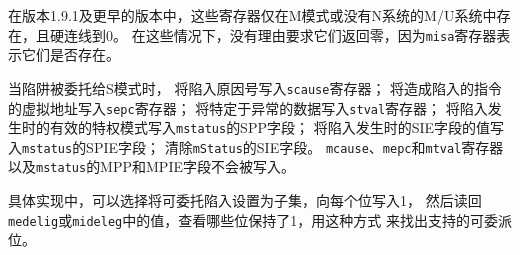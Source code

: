 \iffalse
\begin{commentary}
  In versions 1.9.1 and earlier , these registers existed but were
  hardwired to zero in M-mode only, or M/U without N systems.  There
  is no reason to require they return zero in those cases, as the {\tt
    misa} register indicates whether they exist.
\end{commentary}
\fi

\begin{commentary}
 在版本1.9.1及更早的版本中，这些寄存器仅在M模式或没有N系统的M/U系统中存在，且硬连线到0。
 在这些情况下，没有理由要求它们返回零，因为{\tt misa}寄存器表示它们是否存在。
\end{commentary}

\iffalse
When a trap is delegated to S-mode, the
{\tt scause} register is written with the trap cause; the
{\tt sepc} register is written with the virtual address of
the instruction that took the trap; the
{\tt stval} register is written with an
exception-specific datum; the SPP field
of {\tt mstatus} is written with the active privilege mode at the time of
the trap; the SPIE field of {\tt mstatus} is written with the
value of the SIE field at the time of the trap; and
the SIE field of {\tt mstatus} is cleared.
The {\tt mcause}, {\tt mepc}, and {\tt mtval} registers and the MPP and
MPIE fields of {\tt mstatus} are not written.

An implementation can choose to subset the delegatable traps, with the
supported delegatable bits found by writing one to every bit location,
then reading back the value in {\tt medeleg} or {\tt mideleg} to see
which bit positions hold a one.

An implementation shall not have any bits of {\tt medeleg} be read-only one, i.e.,
any synchronous trap that can be delegated must support not being delegated.
Similarly, an implementation shall not fix as read-only one any bits of
{\tt mideleg} corresponding to machine-level interrupts (but may do so
for lower-level interrupts).


\fi

当陷阱被委托给S模式时，
将陷入原因号写入{\tt scause}寄存器；
将造成陷入的指令的虚拟地址写入{\tt sepc}寄存器；
将特定于异常的数据写入{\tt stval}寄存器；
将陷入发生时的有效的特权模式写入{\tt mstatus}的SPP字段；
将陷入发生时的SIE字段的值写入{\tt mstatus}的SPIE字段；
清除{\tt mStatus}的SIE字段。
{\tt mcause}、{\tt mepc}和{\tt mtval}寄存器以及{\tt mstatus}的MPP和MPIE字段不会被写入。

具体实现中，可以选择将可委托陷入设置为子集，向每个位写入1，
然后读回{\tt medelig}或{\tt mideleg}中的值，查看哪些位保持了1，用这种方式
来找出支持的可委派位。

